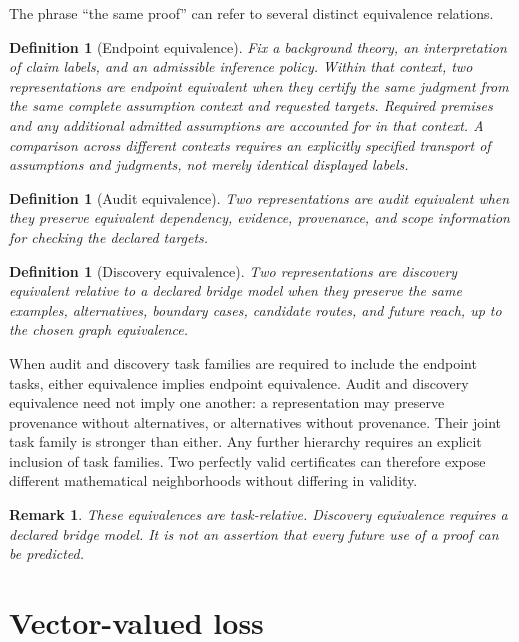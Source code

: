 \documentclass[11pt,oneside]{article}
\theoremstyle{komorebiplain}
\theoremstyle{komorebidefinition}
\newtheorem{definition}[theorem]{Definition}
\theoremstyle{komorebiremark}
\newtheorem{remark}[theorem]{Remark}
\begin{document}
The phrase ``the same proof'' can refer to several distinct equivalence relations.

\begin{definition}[Endpoint equivalence]
\label{res:8:1}
Fix a background theory, an interpretation of claim labels, and an admissible inference policy. Within that context, two representations are endpoint equivalent when they certify the same judgment from the same complete assumption context and requested targets. Required premises and any additional admitted assumptions are accounted for in that context. A comparison across different contexts requires an explicitly specified transport of assumptions and judgments, not merely identical displayed labels.
\end{definition}

\begin{definition}[Audit equivalence]
\label{res:8:2}
Two representations are audit equivalent when they preserve equivalent dependency, evidence, provenance, and scope information for checking the declared targets.
\end{definition}

\begin{definition}[Discovery equivalence]
\label{res:8:3}
Two representations are discovery equivalent relative to a declared bridge model when they preserve the same examples, alternatives, boundary cases, candidate routes, and future reach, up to the chosen graph equivalence.
\end{definition}

When audit and discovery task families are required to include the endpoint tasks, either equivalence implies endpoint equivalence. Audit and discovery equivalence need not imply one another: a representation may preserve provenance without alternatives, or alternatives without provenance. Their joint task family is stronger than either. Any further hierarchy requires an explicit inclusion of task families. Two perfectly valid certificates can therefore expose different mathematical neighborhoods without differing in validity.

\begin{remark}
\label{res:8:4}
These equivalences are task-relative. Discovery equivalence requires a declared bridge model. It is not an assertion that every future use of a proof can be predicted.
\end{remark}


\section{Vector-valued loss}
\label{sec:old9}
\end{document}
